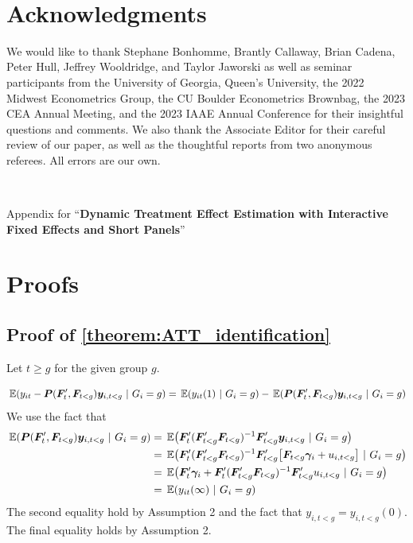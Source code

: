 \documentclass[12pt]{article}
\begin{document}
\newpage~\section*{Acknowledgments}

We would like to thank Stephane Bonhomme, Brantly Callaway, Brian Cadena, Peter Hull, Jeffrey Wooldridge, and Taylor Jaworski as well as seminar participants from the University of Georgia, Queen's University, the 2022 Midwest Econometrics Group, the CU Boulder Econometrics Brownbag, the 2023 CEA Annual Meeting, and the 2023 IAAE Annual Conference for their insightful questions and comments. We also thank the Associate Editor for their careful review of our paper, as well as the thoughtful reports from two anonymous referees. All errors are our own.


\newpage~\appendix

\begin{center}
    Appendix for ``\textbf{Dynamic Treatment Effect Estimation with Interactive Fixed Effects and Short Panels}''
\end{center}

\section{Proofs}\label{sec:proofs}



\subsection*{Proof of \autoref{theorem:ATT_identification}}

Let $t \geq g$ for the given group $g$.

\begin{equation*}
    \expec{y_{it} - \bm P(\bm{F}_{t}', \bm{F}_{t < g}) \bm y_{i,t < g}}{G_i = g} = \expec{y_{it}(1)}{G_i = g} - \expec{\bm P(\bm{F}_{t}', \bm{F}_{t < g}) \bm y_{i,t < g}}{G_i = g} 
\end{equation*}
We use the fact that 
\begin{align*}
    \expec{ \bm P(\bm{F}_{t}', \bm{F}_{t < g}) \bm y_{i,t < g} }{G_i = g} 
    &= \expec{ \bm{F}_{t}' (\bm{F}_{t < g}' \bm{F}_{t < g})^{-1} \bm{F}_{t < g}' \bm y_{i,t < g} }{G_i = g} \\
    &= \expec{ \bm{F}_{t}' (\bm{F}_{t < g}' \bm{F}_{t < g})^{-1} \bm{F}_{t < g}' \big[\bm{F}_{t < g} \bm \gamma_i + u_{i,t < g} \big] }{G_i = g} \\
    &= \expec{ \bm{F}_{t}' \bm \gamma_i + \bm{F}_{t}' (\bm{F}_{t < g}' \bm{F}_{t < g})^{-1} \bm{F}_{t < g}' u_{i,t < g} }{G_i = g} \\
    &= \expec{ y_{it}(\infty) }{G_i = g} 
\end{align*}
The second equality hold by Assumption 2 and the fact that $y_{i,t < g} = y_{i, t < g}(0)$. The final equality holds by Assumption 2.
\end{document}
